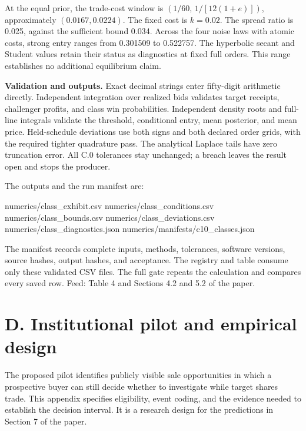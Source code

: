 \documentclass[
  11pt,
]{article}
\newenvironment{Shaded}{}{}
\newcommand{\NormalTok}[1]{#1}
\begin{document}
At the equal prior, the trade-cost window is \((1/60,\,1/[12(1+e)])\),
approximately
\((0.0167,0.0224)\). The fixed
cost is \(k=0.02\). The spread ratio is
0.025, against the sufficient bound
0.034. Across the four noise laws with atomic
costs, strong entry ranges from 0.301509 to
0.522757. The hyperbolic secant and Student values
retain their status as diagnostics at fixed full orders. This range
establishes no additional equilibrium claim.

\textbf{Validation and outputs.} Exact decimal strings enter fifty-digit
arithmetic directly. Independent integration over realized bids
validates target receipts, challenger profits, and class win
probabilities. Independent density roots and full-line integrals
validate the threshold, conditional entry, mean posterior, and mean
price. Held-schedule deviations use both signs and both declared order
grids, with the required tighter quadrature pass. The analytical Laplace
tails have zero truncation error. All C.0 tolerances stay unchanged; a
breach leaves the result open and stops the producer.

The outputs and the run manifest are:

\begin{Shaded}
\begin{Highlighting}[]
\NormalTok{numerics/class\_exhibit.csv}
\NormalTok{numerics/class\_conditions.csv}
\NormalTok{numerics/class\_bounds.csv}
\NormalTok{numerics/class\_deviations.csv}
\NormalTok{numerics/class\_diagnostics.json}
\NormalTok{numerics/manifests/c10\_classes.json}
\end{Highlighting}
\end{Shaded}

The manifest records complete inputs, methods, tolerances, software
versions, source hashes, output hashes, and acceptance. The registry and
table consume only these validated CSV files. The full gate repeats the
calculation and compares every saved row. Feed: Table 4 and Sections
4.2 and 5.2 of the paper.

\section{D. Institutional pilot and empirical design}\label{oa-d}

The proposed pilot identifies publicly visible sale opportunities in
which a prospective buyer can still decide whether to investigate while
target shares trade. This appendix specifies eligibility, event coding,
and the evidence needed to establish the decision interval. It is a research design for the predictions in Section 7 of the paper.
\end{document}
